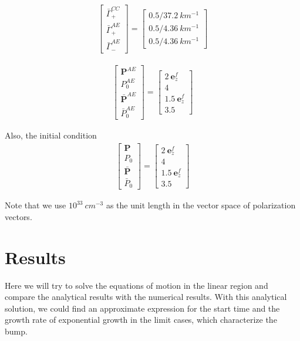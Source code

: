 \documentclass[aps,prd,twocolumn,amsmath,amssymb,groupedaddress]{revtex4-2}
\begin{document}
\begin{eqnarray}
	\begin{bmatrix}
		\bar{\Gamma}^{CC}_+ \\ \bar{\Gamma}^{AE}_+ \\ \bar{\Gamma}^{AE}_-
	\end{bmatrix}
	= \begin{bmatrix}
		0.5/37.2 ~km^{-1} \\ 0.5/4.36 ~km^{-1} \\ 0.5/4.36 ~km^{-1} 
	\end{bmatrix}
\end{eqnarray}

\begin{eqnarray}
	\begin{bmatrix}
		\textbf{P}^{AE} \\ P^{AE}_0 \\ \bar{\textbf{P}}^{AE} \\ \bar{P}^{AE}_0
	\end{bmatrix}
	= \begin{bmatrix}
		2 ~\textbf{e}_z^f\\ 4 \\ 1.5 ~\textbf{e}_z^f \\ 3.5
	\end{bmatrix}
\end{eqnarray}

Also, the initial condition
\begin{eqnarray}
\begin{bmatrix}
	\textbf{P} \\ P_0 \\ \bar{\textbf{P}} \\ \bar{P}_0
\end{bmatrix}
= \begin{bmatrix}
	2 ~\textbf{e}_z^f\\ 4 \\ 1.5 ~\textbf{e}_z^f \\ 3.5
\end{bmatrix}
\end{eqnarray}

Note that we use $10^{33} ~cm^{-3}$ as the unit length in the vector space of polarization vectors.

\section{\label{sec:results} Results}
Here we will try to solve the equations of motion in the linear region and compare the analytical results with the numerical results. With this analytical solution, we could find an approximate expression for the start time and the growth rate of exponential growth in the limit cases, which characterize the bump.
\end{document}
